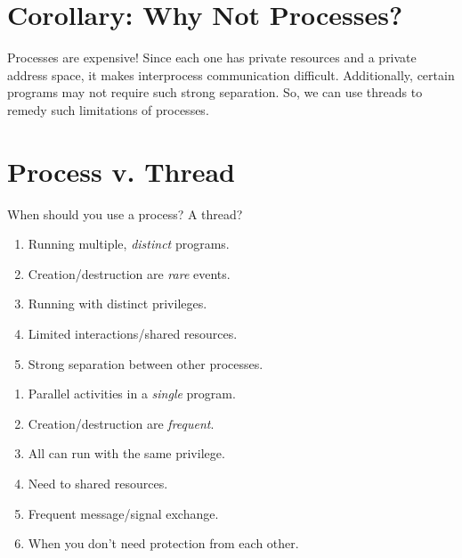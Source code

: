 \documentclass{report}
\begin{document}
\section*{Corollary: Why Not Processes?}
Processes are expensive! Since each one has private resources and a private address space, it makes
interprocess communication difficult. Additionally, certain programs may not require such strong
separation. So, we can use threads to remedy such limitations of processes.





\section{Process v. Thread}
When should you use a process? A thread?

\begin{tcbraster}[raster columns=2, raster equal height, raster force size=false]
  \begin{tcolorbox}[colback=teal!5!white,colframe=black!75!teal,title=Processes]
    \begin{enumerate}[label=\textit{(\roman*)}]
    \item Running multiple, \textit{distinct} programs.
    \item Creation/destruction are \textit{rare} events.
    \item Running with distinct privileges.
    \item Limited interactions/shared resources.
    \item Strong separation between other processes.
    \end{enumerate}
  \end{tcolorbox}
  \begin{tcolorbox}[colback=yellow!5!white,colframe=black!75!yellow,title=Threads]
    \begin{enumerate}[label=\textit{(\roman*)}]
    \item Parallel activities in a \textit{single} program.
    \item Creation/destruction are \textit{frequent}.
    \item All can run with the same privilege.
    \item Need to shared resources.
    \item Frequent message/signal exchange.
    \item When you don't need protection from each other.
    \end{enumerate}
  \end{tcolorbox}
\end{tcbraster}
\end{document}
